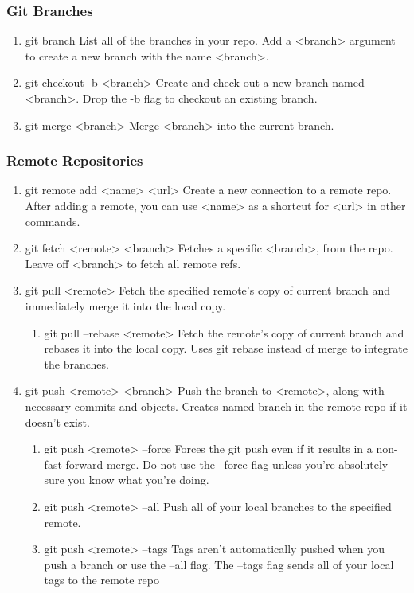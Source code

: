\documentclass[11pt]{article}
\begin{document}
\subsubsection{Git Branches}
\label{sec:orgcbb081e}
\begin{enumerate}
\item git branch
\label{sec:orgdb4bb60}
List all of the branches in your repo. Add a <branch> argument to
create a new branch with the name <branch>.
\item git checkout -b <branch>
\label{sec:org5714411}
Create and check out a new branch named <branch>. Drop the -b
flag to checkout an existing branch.
\item git merge <branch>
\label{sec:org57148f2}
Merge <branch> into the current branch.
\end{enumerate}
\subsubsection{Remote Repositories}
\label{sec:org8bf8d71}
\begin{enumerate}
\item git remote add <name> <url>
\label{sec:org173332f}
Create a new connection to a remote repo. After adding a remote,
you can use <name> as a shortcut for <url> in other commands.
\item git fetch <remote> <branch>
\label{sec:orgae05b8a}
Fetches a specific <branch>, from the repo. Leave off <branch> to
fetch all remote refs.
\item git pull <remote>
\label{sec:org0ec11bc}
Fetch the specified remote’s copy of current branch and immediately
merge it into the local copy.
\begin{enumerate}
\item git pull --rebase <remote>
\label{sec:org20098e2}
Fetch the remote’s copy of current branch and rebases it into the local
copy. Uses git rebase instead of merge to integrate the branches.
\end{enumerate}
\item git push <remote> <branch>
\label{sec:orga52f179}
Push the branch to <remote>, along with necessary commits and
objects. Creates named branch in the remote repo if it doesn’t exist.
\begin{enumerate}
\item git push <remote> --force
\label{sec:orgb3dbf97}
Forces the git push even if it results in a non-fast-forward merge. Do not use
the --force flag unless you’re absolutely sure you know what you’re doing.
\item git push <remote> --all
\label{sec:org5d27914}
Push all of your local branches to the specified remote.
\item git push <remote> --tags
\label{sec:orga0f71c4}
Tags aren’t automatically pushed when you push a branch or use the
--all flag. The --tags flag sends all of your local tags to the remote repo
\end{enumerate}
\end{enumerate}
\end{document}
